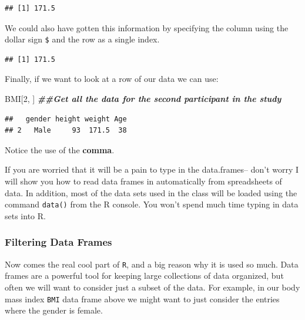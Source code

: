 \documentclass[
]{book}
\newenvironment{Shaded}{\begin{snugshade}}{\end{snugshade}}
\newcommand{\DecValTok}[1]{\textcolor[rgb]{0.00,0.00,0.81}{#1}}
\newcommand{\DocumentationTok}[1]{\textcolor[rgb]{0.56,0.35,0.01}{\textbf{\textit{#1}}}}
\newcommand{\NormalTok}[1]{#1}
\newcommand{\SpecialCharTok}[1]{\textcolor[rgb]{0.00,0.00,0.00}{#1}}
\theoremstyle{definition}
\theoremstyle{definition}
\theoremstyle{definition}
\theoremstyle{definition}
\theoremstyle{remark}
\begin{document}
\begin{verbatim}
## [1] 171.5
\end{verbatim}

We could also have gotten this information by specifying the column using the dollar sign \texttt{\$} and the row as a single index.

\begin{Shaded}
\end{Shaded}

\begin{verbatim}
## [1] 171.5
\end{verbatim}

Finally, if we want to look at a row of our data we can use:

\begin{Shaded}
\begin{Highlighting}[]
\NormalTok{BMI[}\DecValTok{2}\NormalTok{, ]  }\DocumentationTok{\#\#Get all the data for the second participant in the study}
\end{Highlighting}
\end{Shaded}

\begin{verbatim}
##   gender height weight Age
## 2   Male     93  171.5  38
\end{verbatim}

Notice the use of the \textbf{comma}.

If you are worried that it will be a pain to type in the data.frames-- don't worry I will show you how to read data frames in automatically from spreadsheets of data. In addition, most of the data sets used in the class will be loaded using the command \texttt{data()} from the R console. You won't spend much time typing in data sets into R.

\hypertarget{filtering-data-frames}{%
\subsubsection{Filtering Data Frames}\label{filtering-data-frames}}

Now comes the real cool part of \texttt{R}, and a big reason why it is used so much. Data frames are a powerful tool for keeping large collections of data organized, but often we will want to consider just a subset of the data. For example, in our body mass index \texttt{BMI} data frame above we might want to just consider the entries where the gender is female.
\end{document}
